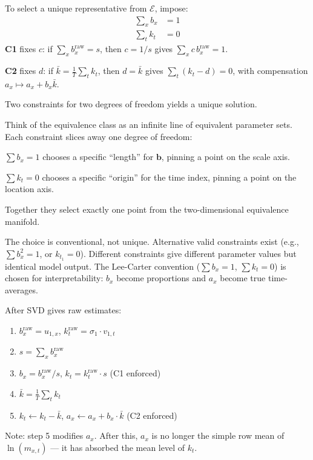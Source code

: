 \documentclass[11pt,a4paper]{article}
\begin{document}
\begin{formaldef}
To select a unique representative from $\mathcal{E}$, impose:
\begin{align}
\sum_{x} b_x &= 1 \tag{C1: scale constraint} \\
\sum_{t} k_t &= 0 \tag{C2: location constraint}
\end{align}
\textbf{C1} fixes $c$: if $\sum_x b_x^{\text{raw}} = s$, then $c = 1/s$ gives $\sum_x c\,b_x^{\text{raw}} = 1$.

\textbf{C2} fixes $d$: if $\bar{k} = \frac{1}{T}\sum_t k_t$, then $d = \bar{k}$ gives $\sum_t (k_t - d) = 0$, with compensation $a_x \mapsto a_x + b_x \bar{k}$.

Two constraints for two degrees of freedom yields a unique solution.
\end{formaldef}

\begin{intuition}
Think of the equivalence class as an infinite line of equivalent parameter sets.
Each constraint slices away one degree of freedom:

$\sum b_x = 1$ chooses a specific ``length'' for $\bm{b}$, pinning a point on the scale axis.

$\sum k_t = 0$ chooses a specific ``origin'' for the time index, pinning a point on the location axis.

Together they select exactly one point from the two-dimensional equivalence manifold.

The choice is conventional, not unique. Alternative valid constraints exist
(e.g., $\sum b_x^2 = 1$, or $k_{t_1} = 0$). Different constraints give different parameter
values but identical model output. The Lee-Carter convention ($\sum b_x = 1$, $\sum k_t = 0$)
is chosen for interpretability: $b_x$ become proportions and $a_x$ become true time-averages.
\end{intuition}

\begin{application}
After SVD gives raw estimates:
\begin{enumerate}[nosep]
\item $b_x^{\text{raw}} = u_{1,x}$, \quad $k_t^{\text{raw}} = \sigma_1 \cdot v_{1,t}$
\item $s = \sum_x b_x^{\text{raw}}$
\item $b_x = b_x^{\text{raw}} / s$, \quad $k_t = k_t^{\text{raw}} \cdot s$ \hfill (C1 enforced)
\item $\bar{k} = \frac{1}{T}\sum_t k_t$
\item $k_t \leftarrow k_t - \bar{k}$, \quad $a_x \leftarrow a_x + b_x \cdot \bar{k}$ \hfill (C2 enforced)
\end{enumerate}
Note: step 5 modifies $a_x$. After this, $a_x$ is no longer the simple row mean of $\ln(m_{x,t})$
--- it has absorbed the mean level of $k_t$.
\end{application}
\end{document}
